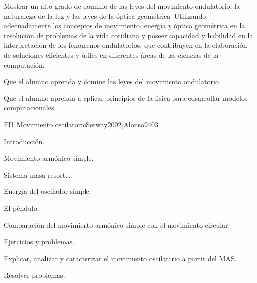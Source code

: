 \begin{syllabus}


\begin{justification}
Mostrar un alto grado de dominio de las leyes del movimiento ondulatorio,
la naturaleza de la luz y las leyes de la óptica geométrica.
Utilizando  adecuadamente los conceptos de movimiento, energía y óptica
geométrica en la resolución de problemas de la vida cotidiana y poseer
capacidad y habilidad en la interpretación de los fenomenos ondulatorios,
que contribuyen en la elaboración de soluciones eficientes y útiles en
diferentes áreas de las ciencias de la computación.
\end{justification}

\begin{goals}
\item Que el alumno aprenda y domine las leyes del movimiento ondulatorio
\item Que el alumno aprenda a aplicar principios de la fisica para edsarrollar modelos computacionales
\end{goals}

\begin{outcomes}
\end{outcomes}

\begin{unit}{FI1 Movimiento oscilatorio}{Serway2002,Alonso94}{0}{3}
\begin{topics}
      \item Introducción.
      \item Movimiento armónico simple.
      \item Sistema masa-resorte.
      \item Energía del oscilador simple.
      \item El péndulo.
      \item Comparación del movimiento armónico simple con el movimiento circular.
      \item Ejercicios y problemas.
   \end{topics}

   \begin{learningoutcomes}
      \item Explicar, analizar y caracterizar el movimiento oscilatorio a partir del MAS.
      \item Resolver problemas.
   \end{learningoutcomes}
\end{unit}


\end{syllabus}
